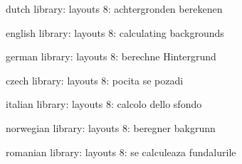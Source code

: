 

\unprotect

\startmessages  dutch  library: layouts
      8: achtergronden berekenen
\stopmessages

\startmessages  english  library: layouts
      8: calculating backgrounds
\stopmessages

\startmessages  german  library: layouts
      8: berechne Hintergrund
\stopmessages

\startmessages  czech  library: layouts
      8: pocita se pozadi
\stopmessages

\startmessages  italian  library: layouts
      8: calcolo dello sfondo
\stopmessages

\startmessages  norwegian  library: layouts
      8: beregner bakgrunn
\stopmessages

\startmessages  romanian  library: layouts
      8: se calculeaza fundalurile
\stopmessages


\newif\ifnewbackground
\newif\ifsomebackground


\appendtoks
  \ifsomebackground \ifnewbackground \setsystemmode\v!background \fi \fi
\to \everybeforepagebody


